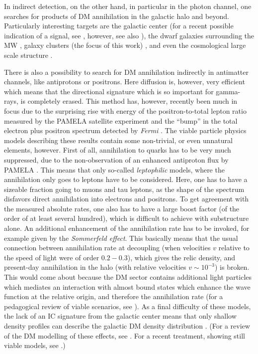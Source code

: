 \documentclass[10pt,aps,pra,reprint,amsmath,amsfonts,amssymb,showpacs,nofootinbib,floatfix]{revtex4-1}
\newcommand{\Fermi}{{\em Fermi}\xspace}
\begin{document}
In indirect detection, on the other hand, in particular in the photon
channel, one searches for products of DM annihilation in the galactic
halo and beyond. Particularly interesting targets are the galactic
center (for a recent possible indication of a signal, see
\cite{2010arXiv1010.2752H}, however, see also
\cite{2010arXiv1012.5839B}), the dwarf galaxies surrounding the MW
\cite{Strigari:2006rd,Essig:2009jx,2010JCAP...01..031S}, galaxy
clusters (the focus of this work)
\cite{Ghigna:1998vn,Lewis:2002mfa,Boyarsky:2006kc,2006A&A...455...21C,2009PhRvL.103r1302P},
and even the cosmological large scale structure
\cite{Bergstrom:2001jj,Ullio:2002pj,Taylor:2002zd,Elsaesser:2004ap,2011MNRAS.tmp..503C,Abazajian:2010sq,Abdo:2010dk,Zavala:2011tt}.

There is also a possibility to search for DM annihilation indirectly
in antimatter channels, like antiprotons or positrons. Here diffusion
is, however, very efficient which means that the directional signature
which is so important for gamma-rays, is completely erased. This
method has, however, recently been much in focus due to the surprising
rise with energy of the positron-to-total lepton ratio measured by the
PAMELA satellite experiment \cite{Adriani:2008zr} and the ``bump'' in
the total electron plus positron spectrum detected by \Fermi
\cite{Abdo:2009zk}. The viable particle physics models describing
these results contain some non-trivial, or even unnatural elements,
however. First of all, annihilation to quarks has to be very much
suppressed, due to the non-observation of an enhanced antiproton flux
by PAMELA \cite{Adriani:2010rc}. This means that only so-called {\em
  leptophilic} models, where the annihilation only goes to leptons
have to be considered. Here, one has to have a sizeable fraction going
to muons and tau leptons, as the shape of the spectrum disfavors
direct annihilation into electrons and positrons. To get agreement
with the measured absolute rates, one also has to have a large boost
factor (of the order of at least several hundred), which is difficult
to achieve with substructure alone. An additional enhancement of the
annihilation rate has to be invoked, for example given by the {\em
  Sommerfeld effect}. This basically means that the usual connection
between annihilation rate at decoupling (when velocities $v$ relative
to the speed of light were of order $0.2 - 0.3$), which gives the
relic density, and present-day annihilation in the halo (with relative
velocities $v\sim 10^{-3}$) is broken. This would come about because
the DM sector contains additional light particles which mediates an
interaction with almost bound states which enhance the wave function
at the relative origin, and therefore the annihilation rate (for a
pedagogical review of viable scenarios, see
\cite{ArkaniHamed:2008qn}). As a final difficulty of these models, the
lack of an IC signature from the galactic center means that only
shallow density profiles can describe the galactic DM density
distribution
\cite{Bertone:2008xr,Cirelli:2008pk,Bergstrom:2008ag}. (For a review
of the DM modelling of these effects, see \cite{Bergstrom:2009ib}. For
a recent treatment, showing still viable models, see
\cite{Finkbeiner:2010sm}.)
\end{document}
